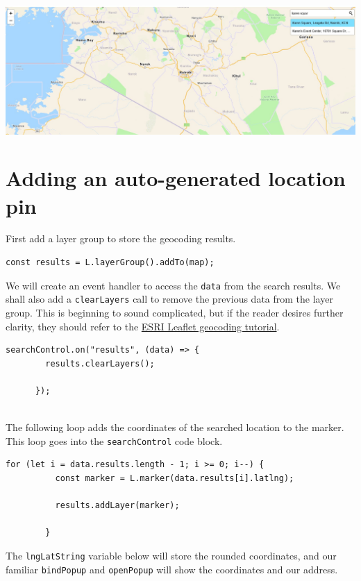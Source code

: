 \documentclass[
]{book}
\begin{document}
\includegraphics{../images/searchable.jpg}

\hypertarget{adding-an-auto-generated-location-pin}{%
\section{Adding an auto-generated location pin}\label{adding-an-auto-generated-location-pin}}

First add a layer group to store the geocoding results.

\begin{verbatim}
const results = L.layerGroup().addTo(map);
\end{verbatim}

We will create an event handler to access the \texttt{data} from the search results. We shall also add a \texttt{clearLayers} call to remove the previous data from the layer group. This is beginning to sound complicated, but if the reader desires further clarity, they should refer to the \href{https://developers.arcgis.com/esri-leaflet/geocode-and-search/search-for-an-address/?utm_source=pocket_saves}{ESRI Leaflet geocoding tutorial}.

\begin{verbatim}
searchControl.on("results", (data) => {
        results.clearLayers();

      });
      
\end{verbatim}

The following loop adds the coordinates of the searched location to the marker. This loop goes into the \texttt{searchControl} code block.

\begin{verbatim}
for (let i = data.results.length - 1; i >= 0; i--) {
          const marker = L.marker(data.results[i].latlng);

          results.addLayer(marker);

        }
\end{verbatim}

The \texttt{lngLatString} variable below will store the rounded coordinates, and our familiar \texttt{bindPopup} and \texttt{openPopup} will show the coordinates and our address.
\end{document}
